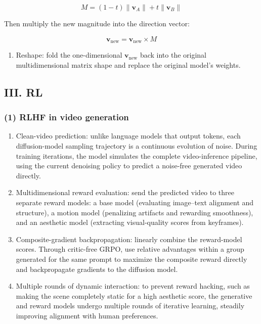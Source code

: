\[
M=(1-t)\|\mathbf{v}_A\|+t\|\mathbf{v}_B\|
\]

Then multiply the new magnitude into the direction vector:

\[
\mathbf{v}_{\mathrm{new}}=\hat{\mathbf{v}}_{\mathrm{new}}\times M
\]

\begin{enumerate}
\def\labelenumi{\arabic{enumi}.}
\setcounter{enumi}{7}
\tightlist
\item
  Reshape: fold the one-dimensional \(\mathbf{v}_{\mathrm{new}}\) back into the original multidimensional matrix shape and replace the original model's weights.
\end{enumerate}

\hypertarget{iii.-rl}{%
\subsection{III. RL}\label{iii.-rl}}

\hypertarget{rlhf-in-video-generation}{%
\subsubsection{(1) RLHF in video generation}\label{rlhf-in-video-generation}}

\begin{enumerate}
\def\labelenumi{\arabic{enumi}.}
\item
  Clean-video prediction: unlike language models that output tokens, each diffusion-model sampling trajectory is a continuous evolution of noise. During training iterations, the model simulates the complete video-inference pipeline, using the current denoising policy to predict a noise-free generated video directly.
\item
  Multidimensional reward evaluation: send the predicted video to three separate reward models: a base model (evaluating image--text alignment and structure), a motion model (penalizing artifacts and rewarding smoothness), and an aesthetic model (extracting visual-quality scores from keyframes).
\item
  Composite-gradient backpropagation: linearly combine the reward-model scores. Through critic-free GRPO, use relative advantages within a group generated for the same prompt to maximize the composite reward directly and backpropagate gradients to the diffusion model.
\item
  Multiple rounds of dynamic interaction: to prevent reward hacking, such as making the scene completely static for a high aesthetic score, the generative and reward models undergo multiple rounds of iterative learning, steadily improving alignment with human preferences.
\end{enumerate}

